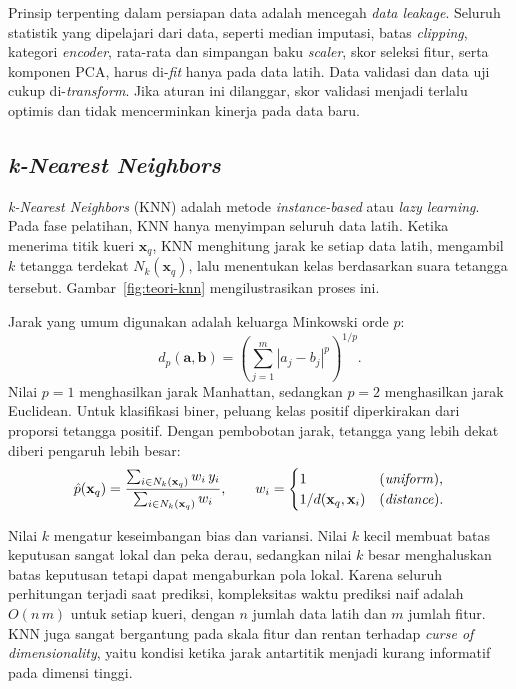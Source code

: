 Prinsip terpenting dalam persiapan data adalah mencegah \textit{data leakage}. Seluruh statistik yang dipelajari dari data, seperti median imputasi, batas \textit{clipping}, kategori \textit{encoder}, rata-rata dan simpangan baku \textit{scaler}, skor seleksi fitur, serta komponen PCA, harus di-\textit{fit} hanya pada data latih. Data validasi dan data uji cukup di-\textit{transform}. Jika aturan ini dilanggar, skor validasi menjadi terlalu optimis dan tidak mencerminkan kinerja pada data baru.

\subsection{\textit{k-Nearest Neighbors}}
\textit{k-Nearest Neighbors} (KNN) adalah metode \textit{instance-based} atau \textit{lazy learning}. Pada fase pelatihan, KNN hanya menyimpan seluruh data latih. Ketika menerima titik kueri $\mathbf{x}_q$, KNN menghitung jarak ke setiap data latih, mengambil $k$ tetangga terdekat $N_k(\mathbf{x}_q)$, lalu menentukan kelas berdasarkan suara tetangga tersebut. Gambar~\ref{fig:teori-knn} mengilustrasikan proses ini.

Jarak yang umum digunakan adalah keluarga Minkowski orde $p$:
\begin{equation}
    d_p(\mathbf{a},\mathbf{b})=\left(\sum_{j=1}^{m}|a_j-b_j|^{p}\right)^{1/p}.
    \label{eq:minkowski}
\end{equation}
Nilai $p=1$ menghasilkan jarak Manhattan, sedangkan $p=2$ menghasilkan jarak Euclidean. Untuk klasifikasi biner, peluang kelas positif diperkirakan dari proporsi tetangga positif. Dengan pembobotan jarak, tetangga yang lebih dekat diberi pengaruh lebih besar:
\begin{equation}
    \hat{p}(\mathbf{x}_q)=\frac{\sum_{i\in N_k(\mathbf{x}_q)}w_i\,y_i}{\sum_{i\in N_k(\mathbf{x}_q)}w_i},\qquad
    w_i=\begin{cases}1 & \text{(\textit{uniform})},\\ 1/d(\mathbf{x}_q,\mathbf{x}_i) & \text{(\textit{distance})}.\end{cases}
    \label{eq:knn-proba}
\end{equation}

Nilai $k$ mengatur keseimbangan bias dan variansi. Nilai $k$ kecil membuat batas keputusan sangat lokal dan peka derau, sedangkan nilai $k$ besar menghaluskan batas keputusan tetapi dapat mengaburkan pola lokal. Karena seluruh perhitungan terjadi saat prediksi, kompleksitas waktu prediksi naif adalah $O(n\,m)$ untuk setiap kueri, dengan $n$ jumlah data latih dan $m$ jumlah fitur. KNN juga sangat bergantung pada skala fitur dan rentan terhadap \textit{curse of dimensionality}, yaitu kondisi ketika jarak antartitik menjadi kurang informatif pada dimensi tinggi.


